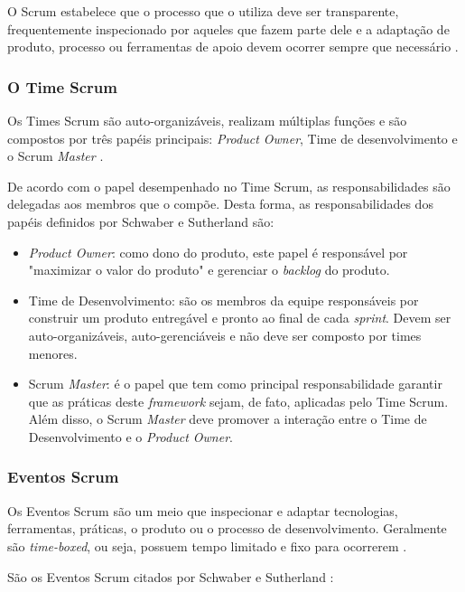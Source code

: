 O Scrum estabelece que o processo que o utiliza deve ser transparente, frequentemente inspecionado por aqueles que fazem parte dele e a adaptação de produto, processo ou ferramentas de apoio devem ocorrer sempre que necessário \cite{schwaber_guia_2013}.

\subsubsection{O Time Scrum}
Os Times Scrum são auto-organizáveis, realizam múltiplas funções e são compostos por três papéis principais: \textit{Product Owner}, Time de desenvolvimento e o Scrum \textit{Master} \cite{schwaber_guia_2013}.

De acordo com o papel desempenhado no Time Scrum, as responsabilidades são delegadas aos membros que o compõe. Desta forma, as responsabilidades dos papéis definidos por Schwaber e Sutherland \cite{schwaber_guia_2013} são:

\begin{itemize}
\item \textit{Product Owner}: como dono do produto, este papel é responsável por "maximizar o valor do produto" e gerenciar o \textit{backlog} do produto.

\item Time de Desenvolvimento: são os membros da equipe responsáveis por construir um produto entregável e pronto ao final de cada \textit{sprint}. Devem ser auto-organizáveis, auto-gerenciáveis e não deve ser composto por times menores.

\item Scrum \textit{Master}: é o papel que tem como principal responsabilidade garantir que as práticas deste \textit{framework} sejam, de fato, aplicadas pelo Time Scrum. Além disso, o Scrum \textit{Master} deve promover a interação entre o Time de Desenvolvimento e o \textit{Product Owner}.

\end{itemize}
\subsubsection{Eventos Scrum}
Os Eventos Scrum são um meio que inspecionar e adaptar tecnologias, ferramentas, práticas, o produto ou o processo de desenvolvimento. Geralmente são \textit{time-boxed}, ou seja, possuem tempo limitado e fixo para ocorrerem \cite{schwaber_guia_2013}.

São os Eventos Scrum citados por Schwaber e Sutherland \cite{schwaber_guia_2013}:

